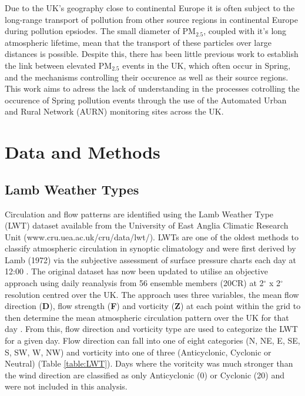 \documentclass[10pt]{article}
\begin{document}
Due to the UK's geography close to continental Europe it is often subject to the long-range transport of pollution from other source regions in continental Europe during pollution epsiodes. The small diameter of PM$_{2.5}$, coupled with it's long atmospheric lifetime, mean that the transport of these particles over large distances is possible. Despite this, there has been little previous work to establish the link between elevated PM$_{2.5}$ events in the UK, which often occur in Spring, and the mechanisms controlling their occurence as well as their source regions. This work aims to adress the lack of understanding in the processes cotrolling the occurence of Spring pollution events  through the use of the Automated Urban and Rural Network (AURN) monitoring sites across the UK.\\

\section*{Data and Methods}

\subsection*{Lamb Weather Types}
Circulation and flow patterns are identified using the Lamb Weather Type (LWT) dataset available from the University of East Anglia Climatic Research Unit (www.cru.uea.ac.uk/cru/data/lwt/). LWTs are one of the oldest methods to classify atmospheric circulation in synoptic climatology and were first derived by Lamb (1972) via the subjective assessment of surface pressure charts each day at 12:00 \cite{Jones2013}. The original dataset has now been updated to utilise an  objective approach using daily reanalysis from 56 ensemble members (20CR) \cite{Compo2011} at 2$^{\circ}$ x 2$^{\circ}$ resolution centred over the UK. The approach uses three variables, the mean flow direction (\textbf{D}), flow strength (\textbf{F}) and vorticity (\textbf{Z}) at each point within the grid to then determine the mean atmospheric circulation pattern over the UK for that day \cite{Compo2011}. From this, flow direction and vorticity type are used to categorize the LWT for a given day. Flow direction can fall into one of eight categories (N, NE, E, SE, S, SW, W, NW) and vorticity into one of three (Anticyclonic, Cyclonic or Neutral) (Table \ref{table:LWT}). Days where the voritcity was much stronger than the wind direction are classified as only Anticyclonic (0) or Cyclonic (20) and were not included in this analysis. \\
\end{document}

